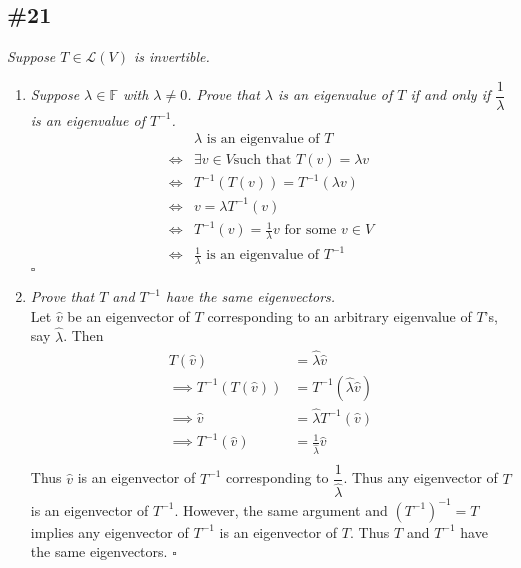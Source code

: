 \documentclass[12pt]{article}
\begin{document}
\subsection*{\#21}
{\it Suppose $T \in \mathcal{L}(V)$ is invertible.}
	\begin{enumerate}[\it\ \ (a)\ \ ]
		\item {\it Suppose $\lambda \in \mathbb{F}$ with $\lambda \neq 0$.  Prove that $\lambda$ is an eigenvalue of $T$ if and only if $\dfrac{1}{\lambda}$ is an eigenvalue of $T^{-1}$.} \\
		\begin{align*}
			&\lambda \text{ is an eigenvalue of }T \\[.1cm]
			\iff &\exists v \in V \text{such that }T(v) = \lambda v \\[.1cm]
			\iff &T^{-1}(T(v)) = T^{-1}(\lambda v) \\[.1cm]
			\iff &v = \lambda T^{-1}(v) \\[.1cm]
			\iff &T^{-1}(v) = \frac{1}{\lambda}v \text{ for some $v \in V$}\\[.1cm]
			\iff &\frac{1}{\lambda} \text{ is an eigenvalue of }T^{-1}
		\end{align*}\hfill $\square$
		\item {\it Prove that $T$ and $T^{-1}$ have the same eigenvectors.} \\
		
		\noindent Let $\hat{v}$ be an eigenvector of $T$ corresponding to an arbitrary eigenvalue of $T$'s, say $\hat{\lambda}$.  Then
		\begin{align*}
			T(\hat{v}) &= \hat{\lambda}\hat{v} \\
			\implies T^{-1}(T(\hat{v})) &= T^{-1}(\hat{\lambda}\hat{v}) \\
			\implies \hat{v} &= \hat{\lambda}T^{-1}(\hat{v}) \\
			\implies T^{-1}(\hat{v}) &= \frac{1}{\hat{\lambda}}\hat{v} \\
		\end{align*}
		Thus $\hat{v}$ is an eigenvector of $T^{-1}$ corresponding to $\dfrac{1}{\hat{\lambda}}$.  Thus any eigenvector of $T$ is an eigenvector of $T^{-1}$.  However, the same argument and $(T^{-1})^{-1} = T$ implies any eigenvector of $T^{-1}$ is an eigenvector of $T$.  Thus $T$ and $T^{-1}$ have the same eigenvectors. \hfill $\square$
	\end{enumerate}
\end{document}

